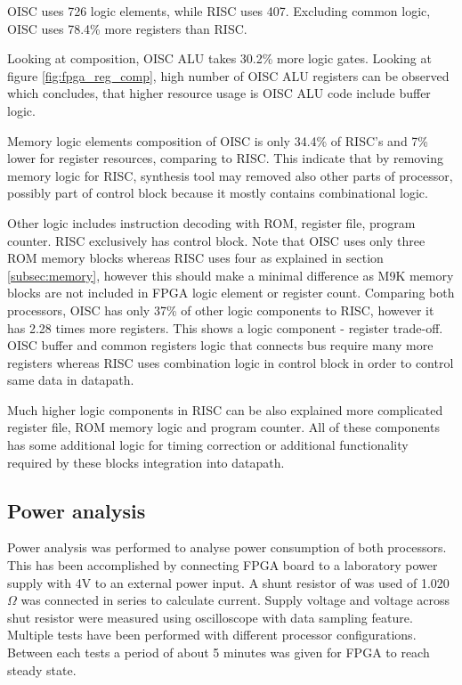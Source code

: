 OISC uses 726 logic elements, while RISC uses 407. Excluding common logic, OISC uses 78.4\% more registers than RISC.

Looking at composition, OISC ALU takes 30.2\% more logic gates. Looking at figure \ref{fig:fpga_reg_comp}, high number of OISC ALU registers can be observed which concludes, that higher resource usage is OISC ALU code include buffer logic.

Memory logic elements composition of OISC is only 34.4\% of RISC's and 7\% lower for register resources, comparing to RISC. This indicate that by removing memory logic for RISC, synthesis tool may removed also other parts of processor, possibly part of control block because it mostly contains combinational logic.

Other logic includes instruction decoding with ROM, register file, program counter. RISC exclusively has control block. Note that OISC uses  only three ROM memory blocks whereas RISC uses four as explained in section \ref{subsec:memory}, however this should make a minimal difference as M9K memory blocks are not included in FPGA logic element or register count. Comparing both processors, OISC has only 37\% of other logic components to RISC, however it has 2.28 times more registers. This shows a logic component - register trade-off. OISC buffer and common registers logic that connects bus require many more registers whereas RISC uses combination logic in control block in order to control same data in datapath. 

Much higher logic components in RISC can be also explained more complicated register file, ROM memory logic and program counter. All of these components has some additional logic for timing correction or additional functionality required by these blocks integration into datapath.

\subsection{Power analysis}

Power analysis was performed to analyse power consumption of both processors.
This has been accomplished by connecting FPGA board to a laboratory power supply with 4V to an external power input. A shunt resistor of was used of 1.020$\Omega$ was connected in series to calculate current. Supply voltage and voltage across shut resistor were measured using oscilloscope with data sampling feature. Multiple tests have been performed with different processor configurations. Between each tests a period of about 5 minutes was given for FPGA to reach steady state. 


